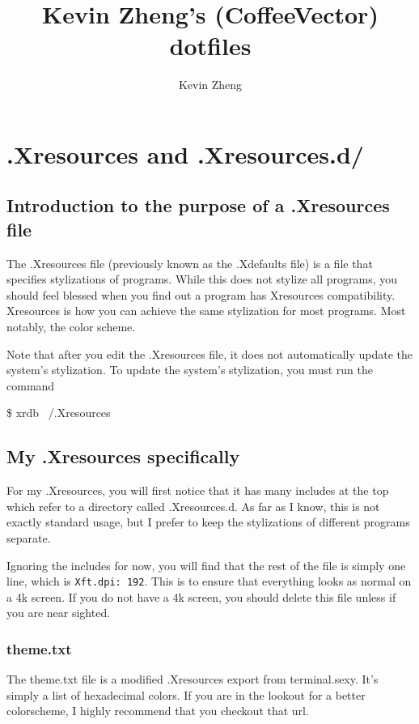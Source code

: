 \documentclass[letterpaper,12pt]{article}
\title{Kevin Zheng's (CoffeeVector) dotfiles}
\author{Kevin Zheng}
\begin{document}
\maketitle
\tableofcontents
\section{.Xresources and .Xresources.d/}
\subsection{Introduction to the purpose of a .Xresources file}
\par The .Xresources file (previously known as the .Xdefaults file) is a file that specifies stylizations of programs.
While this does not stylize all programs, you should feel blessed when you find out a program has Xresources compatibility.
Xresources is how you can achieve the same stylization for most programs.
Most notably, the color scheme.
\par Note that after you edit the .Xresources file, it does not automatically update the system's stylization.
To update the system's stylization, you must run the command
\begin{center}
	\$ xrdb ~/.Xresources
\end{center}
\subsection{My .Xresources specifically}
\par For my .Xresources, you will first notice that it has many includes at the top which refer to a directory called .Xresources.d.
As far as I know, this is not exactly standard usage, but I prefer to keep the stylizations of different programs separate.
\par Ignoring the includes for now, you will find that the rest of the file is simply one line, which is \lstinline{Xft.dpi: 192}.
This is to ensure that everything looks as normal on a 4k screen.
If you do not have a 4k screen, you should delete this file unless if you are near sighted.
\subsubsection{theme.txt}
\par The theme.txt file is a modified .Xresources export from terminal.sexy.
It's simply a list of hexadecimal colors.
If you are in the lookout for a better colorscheme, I highly recommend that you checkout that url.
\end{document}
